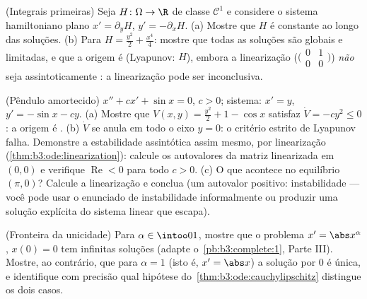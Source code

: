 \begin{exercise}[$\star\star$]\label{exo:b3:ode:7}
(Integrais primeiras) Seja $H \colon \Omega \to \R$ de classe $\mathcal
C^1$ e considere o sistema
hamiltoniano plano $x' =
\partial_yH$, $y' = -\partial_xH$.
(a) Mostre que $H$ é constante ao longo das soluções.
(b) Para $H = \frac{y^2}2 + \frac{x^4}4$: mostre que todas as soluções são globais e limitadas, e
que a origem é  (Lyapunov: $H$), embora a linearização
($\bigl(\begin{smallmatrix}0&1\\0&0\end{smallmatrix}\bigr)$) \emph{não} seja assintoticamente : a linearização pode
ser inconclusiva.
\end{exercise}

\begin{exercise}[$\star\star\star$]\label{exo:b3:ode:8}
(Pêndulo amortecido) $x'' + cx' + \sin x = 0$, $c > 0$; sistema: $x' = y$, $y' = -\sin x - cy$.
(a) Mostre que $V(x, y) = \frac{y^2}2 + 1 - \cos x$ satisfaz $\dot
V = -cy^2 \leq 0$: a origem é .
(b) $\dot V$ se anula em todo o eixo $y = 0$: o critério estrito
de Lyapunov falha. Demonstre a estabilidade assintótica assim mesmo,
por linearização (\cref{thm:b3:ode:linearization}): calcule os autovalores da matriz
linearizada em $(0,0)$ e verifique $\operatorname{Re} < 0$ para todo $c > 0$.
(c) O que acontece no equilíbrio $(\pi, 0)$? Calcule a linearização e conclua
(um autovalor positivo: instabilidade --- você pode usar o enunciado de
instabilidade informalmente ou produzir uma solução explícita do sistema
linear que escapa).
\end{exercise}

\begin{exercise}[$\star\star$]\label{exo:b3:ode:9}
(Fronteira da unicidade) Para $\alpha \in \intoo01$, mostre que o problema $x' = \abs x^{\alpha}$, $x(0) = 0$
tem infinitas soluções (adapte o~\cref{pb:b3:complete:1}, Parte III). Mostre, ao
contrário, que para $\alpha = 1$ (isto é, $x' = \abs
x$) a solução por $0$ é única,
e identifique com precisão qual hipótese do~\cref{thm:b3:ode:cauchylipschitz} distingue os
dois casos.
\end{exercise}

